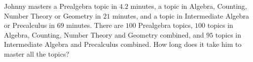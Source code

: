 Johnny masters a Prealgebra topic in $4.2$ minutes, a topic in Algebra, Counting, Number Theory or Geometry in $21$ minutes, and a topic in Intermediate Algebra or Precalculus in $69$ minutes. There are $100$ Prealgebra topics, $100$ topics in Algebra, Counting, Number Theory and Geometry combined, and $95$ topics in Intermediate Algebra and Precalculus combined. How long does it take him to master all the topics?
